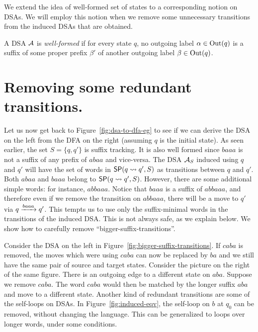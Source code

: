 We extend the idea of well-formed set of states to a corresponding notion on DSAs. We will employ this notion when we remove some unnecessary transitions from the induced DSAs that are obtained.

\begin{definition}\label{def:well-formed-dsa}
  A DSA $\mathcal{A}$ is \emph{well-formed} if for every state $q$, no
  outgoing label $\alpha \in \operatorname{Out}(q)$ is a suffix of some proper prefix
  $\beta'$ of another outgoing label $\beta \in \operatorname{Out}(q)$.
\end{definition}

\section{Removing some redundant transitions.}
\label{sec:removing-redundant}
Let us now get back to Figure~\ref{fig:dsa-to-dfa-eg} to see if we can
derive the DSA on the left from the DFA on the right (assuming $q$ is
the initial state). As seen earlier, the set $S = \{q, q'\}$ is
suffix tracking. It is
also well formed since $baaa$ is not a suffix of any prefix of $abaa$
and vice-versa. The DSA $\mathcal{A}_S$ induced using $q$ and $q'$ will have
the set of words in $\mathsf{SP}(q \rightsquigarrow q', S)$ as transitions between $q$ and
$q'$. Both $abaa$ and $baaa$ belong to $\mathsf{SP}(q \rightsquigarrow q', S)$. However,
there are some additional simple words: for instance, $abbaaa$. Notice
that $baaa$ is a suffix of $abbaaa$, and therefore even if we remove the
transition on $abbaaa$, there will be a move to $q'$ via
$q \xrightarrow{baaa} q'$. This tempts us to use only the suffix-minimal words
in the transitions of the induced DSA. This is not always safe, as we
explain below. We show how to carefully remove
``bigger-suffix-transitions''.

Consider the DSA on the left in
Figure~\ref{fig:bigger-suffix-transitions}. If $caba$ is removed, the
moves which were using $caba$ can now be replaced by $ba$ and we still
have the same pair of source and target states. Consider the picture
on the right of the same figure. There is an outgoing edge to a
different state on $aba$. Suppose we remove $caba$. The word $caba$
would then be matched by the longer suffix $aba$ and move to a
different state.
Another kind of redundant transitions are some of the self-loops on
DSAs. In Figure~\ref{fig:induced-eqv}, the self-loop on $b$ at $q_0$
can be removed, without changing the language. This can be generalized
to loops over longer words, under some conditions. 



